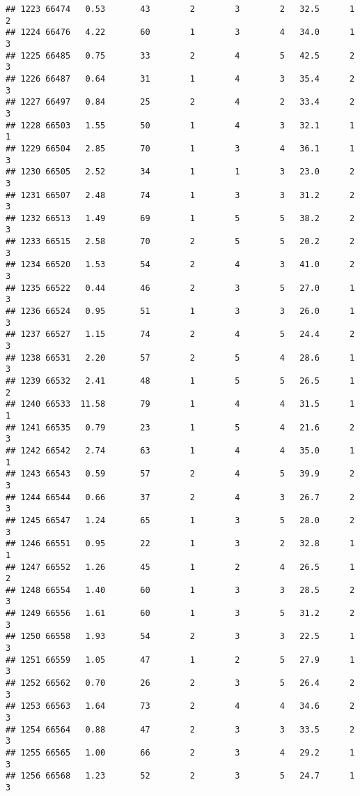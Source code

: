 \documentclass[
]{article}
\begin{document}
\begin{verbatim}
## 1223 66474   0.53       43        2        3        2   32.5      1      2
## 1224 66476   4.22       60        1        3        4   34.0      1      3
## 1225 66485   0.75       33        2        4        5   42.5      2      3
## 1226 66487   0.64       31        1        4        3   35.4      2      3
## 1227 66497   0.84       25        2        4        2   33.4      2      3
## 1228 66503   1.55       50        1        4        3   32.1      1      1
## 1229 66504   2.85       70        1        3        4   36.1      1      3
## 1230 66505   2.52       34        1        1        3   23.0      2      3
## 1231 66507   2.48       74        1        3        3   31.2      2      3
## 1232 66513   1.49       69        1        5        5   38.2      2      3
## 1233 66515   2.58       70        2        5        5   20.2      2      3
## 1234 66520   1.53       54        2        4        3   41.0      2      3
## 1235 66522   0.44       46        2        3        5   27.0      1      3
## 1236 66524   0.95       51        1        3        3   26.0      1      3
## 1237 66527   1.15       74        2        4        5   24.4      2      3
## 1238 66531   2.20       57        2        5        4   28.6      1      3
## 1239 66532   2.41       48        1        5        5   26.5      1      2
## 1240 66533  11.58       79        1        4        4   31.5      1      1
## 1241 66535   0.79       23        1        5        4   21.6      2      3
## 1242 66542   2.74       63        1        4        4   35.0      1      1
## 1243 66543   0.59       57        2        4        5   39.9      2      3
## 1244 66544   0.66       37        2        4        3   26.7      2      3
## 1245 66547   1.24       65        1        3        5   28.0      2      3
## 1246 66551   0.95       22        1        3        2   32.8      1      1
## 1247 66552   1.26       45        1        2        4   26.5      1      2
## 1248 66554   1.40       60        1        3        3   28.5      2      3
## 1249 66556   1.61       60        1        3        5   31.2      2      3
## 1250 66558   1.93       54        2        3        3   22.5      1      3
## 1251 66559   1.05       47        1        2        5   27.9      1      3
## 1252 66562   0.70       26        2        3        5   26.4      2      3
## 1253 66563   1.64       73        2        4        4   34.6      2      3
## 1254 66564   0.88       47        2        3        3   33.5      2      3
## 1255 66565   1.00       66        2        3        4   29.2      1      3
## 1256 66568   1.23       52        2        3        5   24.7      1      3

\end{verbatim}
\end{document}
